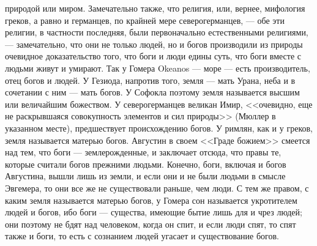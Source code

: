 \documentclass[12pt]{article}
\begin{document}
природой или миром. Замечательно также, что религия, или, вернее, мифология греков, а равно и германцев, по крайней мере северогерманцев, --- обе эти религии, в частности последняя, были первоначально естественными религиями, --- замечательно, что они не только людей, но и богов производили из природы очевидное доказательство того, что боги и люди едины суть, что боги вместе с людьми живут и умирают. Так у Гомера Okeanos --- море --- есть производитель, отец богов и людей. У Гезиода, напротив того, земля --- мать Урана, неба и в сочетании с ним --- мать богов. У Софокла поэтому земля называется высшим или величайшим божеством. У северогерманцев великан Имир, <<очевидно, еще не раскрывшаяся совокупность элементов и сил природы>> (Мюллер в указанном месте), предшествует происхождению богов. У римлян, как и у греков, земля называется матерью богов. Августин в своем <<Граде божием>> смеется над тем, что боги --- землерожденные, и заключает отсюда, что правы те, которые считали богов прежними людьми. Конечно, боги, включая и богов Августина, вышли лишь из земли, и если они и не были людьми в смысле Эвгемера, то они все же не существовали раньше, чем люди. С тем же правом, с каким земля называется матерью богов, у Гомера сон называется укротителем людей и богов, ибо боги --- существа, имеющие бытие лишь для и чрез людей; они поэтому не бдят над человеком, когда он спит, и если люди спят, то спят также и боги, то есть с сознанием людей угасает и существование богов. 
\end{document}
